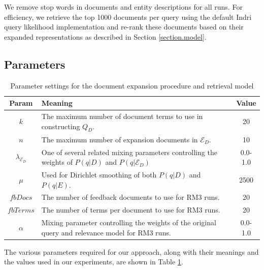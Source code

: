 \documentclass{sig-alternate}
\begin{document}
We remove stop words in documents and entity descriptions for all runs. For efficiency, we retrieve the top 1000 documents per query using the default Indri query likelihood implementation and re-rank these documents based on their expanded representations as described in Section \ref{section.model}.

\subsection{Parameters}\label{section.evaluation.parameters}

\begin{table}[htb]
\centering
\begin{tabular}{|c|p{}|c|} \hline
{\bf Param} & {\bf Meaning} & {\bf Value} \\ \hline
$k$ & The maximum number of document terms to use in constructing $Q_D$. & 20 \\ \hline
$n$ & The maximum number of expansion documents in $\mathcal{E}_D$. & 10 \\ \hline
$\lambda_{\mathcal{E}_D}$ & One of several related mixing parameters controlling the weights of $P(q|D)$ and $P(q|\mathcal{E}_D)$ & 0.0-1.0 \\ \hline
$\mu$ & Used for Dirichlet smoothing of both $P(q|D)$ and $P(q|E)$. & 2500 \\ \hline
$fbDocs$ & The number of feedback documents to use for RM3 runs. & 20 \\ \hline
$fbTerms$ & The number of terms per document to use for RM3 runs. & 20 \\ \hline
$\alpha$ & Mixing parameter controlling the weights of the original query and relevance model for RM3 runs. & 0.0-1.0 \\ \hline
\end{tabular}
\caption{Parameter settings for the document expansion procedure and retrieval model}
\label{table.parameters}
\end{table}

The various parameters required for our approach, along with their meanings and the values used in our experiments, are shown in Table \ref{table.parameters}. 

\end{document}
